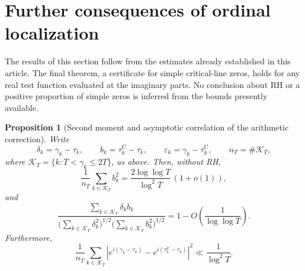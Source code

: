 \documentclass[11pt,a4paper]{article}
\numberwithin{equation}{section}
\newtheorem{proposition}[theorem]{Proposition}
\theoremstyle{definition}
\theoremstyle{remark}
\begin{document}
\section{Further consequences of ordinal localization}\label{sec:additional}
The results of this section follow from the estimates already established in this article. The final theorem, a certificate for simple critical-line zeros, holds for any real test function evaluated at the imaginary parts. No conclusion about RH or a positive proportion of simple zeros is inferred from the bounds presently available.

\begin{proposition}[Second moment and asymptotic correlation of the arithmetic correction]\label{prop:correction_second_moment}
Write
\begin{equation}
\delta_k=\gamma_k-\tau_k,\qquad
b_k=\tau_k^{\mathrm C}-\tau_k,\qquad
\varepsilon_k=\gamma_k-\tau_k^{\mathrm C},\qquad
n_T=\#\mathcal K_T,
\label{eq:disp_37}
\end{equation}
where $\mathcal K_T=\{k:T<\gamma_k\le2T\}$, as above. Then, without RH,
\begin{equation}
\frac1{n_T}\sum_{k\in\mathcal K_T}b_k^2
=\frac{2\log\log T}{\log^2T}\,(1+o(1)),
\label{eq:correction_second_moment}
\end{equation}
and
\begin{equation}
\frac{\sum_{k\in\mathcal K_T}\delta_kb_k}
{\bigl(\sum_{k\in\mathcal K_T}\delta_k^2\bigr)^{1/2}
 \bigl(\sum_{k\in\mathcal K_T}b_k^2\bigr)^{1/2}}
=1-O\!\left(\frac1{\log\log T}\right).
\label{eq:correction_alignment}
\end{equation}
Furthermore,
\begin{equation}
\frac1{n_T}\sum_{k\in\mathcal K_T}
\left|e^{i(\gamma_k-\tau_k)}-e^{i(\tau_k^{\mathrm C}-\tau_k)}\right|^2
\ll\frac1{\log^2T}.
\label{eq:correction_phases}
\end{equation}
\end{proposition}
\end{document}
